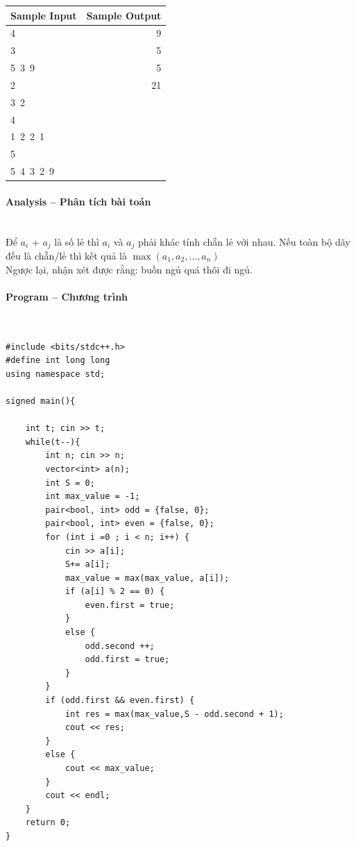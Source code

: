 \documentclass{article}
\begin{document}
\begin{table}[h]
    \centering
    \begin{tabular}{|l|r|}
        \hline
        \textbf{Sample Input} & \textbf{Sample Output} \\
        \hline
        4 & 9 \\
        3 & 5 \\
        5\ 3\ 9 & 5 \\
        2 & 21 \\
        3\ 2 & \\
        4 & \\
        1\ 2\ 2\ 1 & \\
        5 & \\
        5\ 4\ 3\ 2\ 9 & \\
        \hline
    \end{tabular}
\end{table}

\paragraph{Analysis -- Phân tích bài toán} \mbox{} \\

Để $a_i$ + $a_j$ là số lẻ thì $a_i$ và $a_j$ phải khác tính chẵn lẻ với nhau. Nếu toàn bộ dãy đều là chẵn/lẻ thì kết quả là $\max{(a_1, a_2, ..., a_n)}$\\

Ngược lại, nhận xét được rằng: buồn ngủ quá thôi đi ngủ.

\paragraph{Program -- Chương trình} \mbox{} \\

\begin{lstlisting}
#include <bits/stdc++.h>
#define int long long
using namespace std;

signed main(){

	int t; cin >> t;
	while(t--){
		int n; cin >> n;
		vector<int> a(n);
		int S = 0;
		int max_value = -1;
		pair<bool, int> odd = {false, 0};
		pair<bool, int> even = {false, 0};
		for (int i =0 ; i < n; i++) {
			cin >> a[i];
			S+= a[i];
			max_value = max(max_value, a[i]);
			if (a[i] % 2 == 0) {
				even.first = true;
			}
			else {
				odd.second ++;
				odd.first = true;
			}
		}
		if (odd.first && even.first) {
			int res = max(max_value,S - odd.second + 1);
			cout << res;
		}
		else {
			cout << max_value;
		}
		cout << endl;
	}
	return 0;
}
\end{lstlisting}
\end{document}
